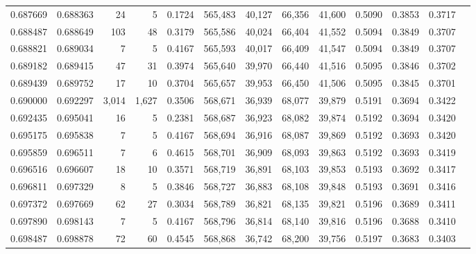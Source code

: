 \begin{tabular}{rrrrrrrrrrrrr}
0.687669 & 0.688363 &     24 &     5 &                                     0.1724 & 565,483 &  40,127 &  66,356 &  41,600 & 0.5090 & 0.3853 & 0.3717 \\
0.688487 & 0.688649 &    103 &    48 &                                     0.3179 & 565,586 &  40,024 &  66,404 &  41,552 & 0.5094 & 0.3849 & 0.3707 \\
0.688821 & 0.689034 &      7 &     5 &                                     0.4167 & 565,593 &  40,017 &  66,409 &  41,547 & 0.5094 & 0.3849 & 0.3707 \\
0.689182 & 0.689415 &     47 &    31 &                                     0.3974 & 565,640 &  39,970 &  66,440 &  41,516 & 0.5095 & 0.3846 & 0.3702 \\
0.689439 & 0.689752 &     17 &    10 &                                     0.3704 & 565,657 &  39,953 &  66,450 &  41,506 & 0.5095 & 0.3845 & 0.3701 \\
0.690000 & 0.692297 &  3,014 & 1,627 &                                     0.3506 & 568,671 &  36,939 &  68,077 &  39,879 & 0.5191 & 0.3694 & 0.3422 \\
0.692435 & 0.695041 &     16 &     5 &                                     0.2381 & 568,687 &  36,923 &  68,082 &  39,874 & 0.5192 & 0.3694 & 0.3420 \\
0.695175 & 0.695838 &      7 &     5 &                                     0.4167 & 568,694 &  36,916 &  68,087 &  39,869 & 0.5192 & 0.3693 & 0.3420 \\
0.695859 & 0.696511 &      7 &     6 &                                     0.4615 & 568,701 &  36,909 &  68,093 &  39,863 & 0.5192 & 0.3693 & 0.3419 \\
0.696516 & 0.696607 &     18 &    10 &                                     0.3571 & 568,719 &  36,891 &  68,103 &  39,853 & 0.5193 & 0.3692 & 0.3417 \\
0.696811 & 0.697329 &      8 &     5 &                                     0.3846 & 568,727 &  36,883 &  68,108 &  39,848 & 0.5193 & 0.3691 & 0.3416 \\
0.697372 & 0.697669 &     62 &    27 &                                     0.3034 & 568,789 &  36,821 &  68,135 &  39,821 & 0.5196 & 0.3689 & 0.3411 \\
0.697890 & 0.698143 &      7 &     5 &                                     0.4167 & 568,796 &  36,814 &  68,140 &  39,816 & 0.5196 & 0.3688 & 0.3410 \\
0.698487 & 0.698878 &     72 &    60 &                                     0.4545 & 568,868 &  36,742 &  68,200 &  39,756 & 0.5197 & 0.3683 & 0.3403 \\

\end{tabular}
